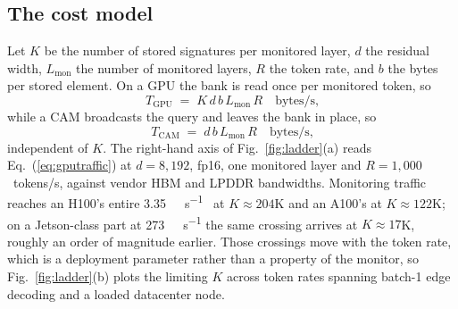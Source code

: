 \documentclass[conference]{IEEEtran}
\newcommand{\cam}{{CAM}\xspace}
\begin{document}
\subsection{The cost model}
\label{sec:Scaling}
\label{subsec:CostModel}
\label{subsec:Ladder}
Let $K$ be the number of stored signatures per monitored layer, $d$ the
residual width, $L_{\mathrm{mon}}$ the number of monitored layers, $R$
the token rate, and $b$ the bytes per stored element. On a GPU the bank
is read once per monitored token, so
%
\begin{equation}
T_{\mathrm{GPU}} \;=\; K \, d \, b \, L_{\mathrm{mon}} \, R
\quad\text{bytes/s,}
\label{eq:gputraffic}
\end{equation}
%
while a \cam broadcasts the query and leaves the bank in place, so
%
\begin{equation}
T_{\mathrm{CAM}} \;=\; d \, b \, L_{\mathrm{mon}} \, R
\quad\text{bytes/s,}
\label{eq:camtraffic}
\end{equation}
%
independent of $K$. The right-hand axis of Fig.~\ref{fig:ladder}(a)
reads Eq.~(\ref{eq:gputraffic}) at $d=8{,}192$, fp16, one monitored
layer and $R=1{,}000$~tokens/s, against vendor HBM and LPDDR
bandwidths. Monitoring traffic reaches an H100's entire
\qty{3.35}{\tera\byte\per\second}~\cite{nvidia_h100} at
$K\!\approx\!204$K and an A100's at $K\!\approx\!122$K; on a
Jetson-class part at \qty{273}{\giga\byte\per\second} the same
crossing arrives at $K\!\approx\!17$K, roughly an order of magnitude
earlier. Those crossings move with the token rate, which is a
deployment parameter rather than a property of the monitor, so
Fig.~\ref{fig:ladder}(b) plots the limiting $K$ across token rates
spanning batch-1 edge decoding and a loaded datacenter node.
\end{document}
